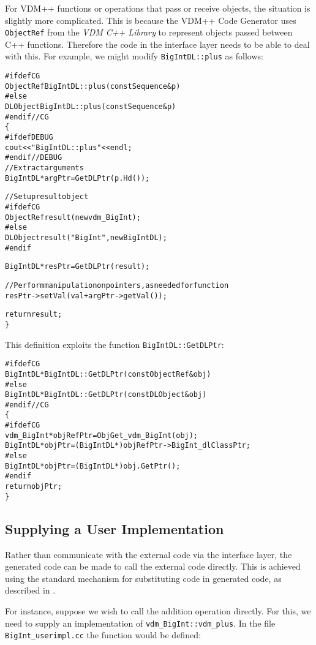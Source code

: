 \documentclass[\pformat,12pt]{article}
\newcommand{\vdmcpplib}{\textit{VDM C++ Library}}
\begin{document}
For VDM++ functions or operations that pass or receive objects, the
situation is slightly more complicated. This is because the VDM++ Code
Generator uses \texttt{ObjectRef} from the {\vdmcpplib} to represent
objects passed between C++ functions. Therefore the code in the
interface layer needs to be able to deal with this. For example, we 
might modify \texttt{BigIntDL::plus} as follows:
\begin{alltt}
\#ifdef CG
ObjectRef BigIntDL::plus (const Sequence &p)
\#else
DLObject BigIntDL::plus (const Sequence &p)
\#endif //CG
\{
\#ifdef DEBUG
  cout << "BigIntDL::plus" << endl;
\#endif //DEBUG
  // Extract arguments
  BigIntDL *argPtr = GetDLPtr(p.Hd());

  // Set up result object
\#ifdef CG
  ObjectRef result (new vdm_BigInt);
\#else
  DLObject result("BigInt", new BigIntDL);
\#endif 

  BigIntDL *resPtr = GetDLPtr(result);

  // Perform manipulation on pointers, as needed for function
  resPtr->setVal( val + argPtr->getVal());

  return result;
\}
\end{alltt}
This definition exploits the function \texttt{BigIntDL::GetDLPtr}:
\begin{alltt}
\#ifdef CG
BigIntDL *BigIntDL::GetDLPtr(const ObjectRef& obj)
\#else
BigIntDL *BigIntDL::GetDLPtr(const DLObject& obj)
\#endif //CG
\{
\#ifdef CG
  vdm_BigInt *objRefPtr = ObjGet_vdm_BigInt(obj);
  BigIntDL *objPtr = (BigIntDL*) objRefPtr->BigInt_dlClassPtr;
\#else
  BigIntDL *objPtr = (BigIntDL*) obj.GetPtr(); 
\#endif
  return objPtr;
\}
\end{alltt}

\subsection{Supplying a User Implementation}

Rather than communicate with the external code via the interface
layer, the generated code can be made to call the external code
directly. This is achieved using the standard mechanism for
substituting code in generated code, as described in \cite{CGManPP-SCSK}. 

For instance, suppose we wish to call the addition
operation  directly. For this, we need to supply an implementation of
\texttt{vdm\_BigInt::vdm\_plus}. In the file
\texttt{BigInt\_userimpl.cc} the function would be defined:
\end{document}

